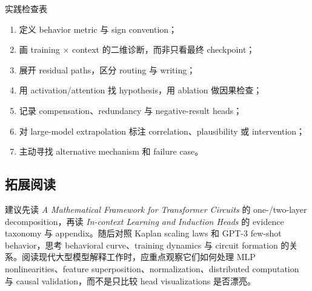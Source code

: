 \documentclass[a4paper]{article}
\begin{document}
\begin{knowledgebox}{实践检查表}
\begin{enumerate}
  \item 定义 behavior metric 与 sign convention；
  \item 画 training × context 的二维诊断，而非只看最终 checkpoint；
  \item 展开 residual paths，区分 routing 与 writing；
  \item 用 activation/attention 找 hypothesis，用 ablation 做因果检查；
  \item 记录 compensation、redundancy 与 negative-result heads；
  \item 对 large-model extrapolation 标注 correlation、plausibility 或 intervention；
  \item 主动寻找 alternative mechanism 和 failure case。
\end{enumerate}
\end{knowledgebox}

\subsection{拓展阅读}

建议先读 \emph{A Mathematical Framework for Transformer Circuits} 的 one-/two-layer decomposition，再读 \emph{In-context Learning and Induction Heads} 的 evidence taxonomy 与 appendix。随后对照 Kaplan scaling laws 和 GPT-3 few-shot behavior，思考 behavioral curve、training dynamics 与 circuit formation 的关系。阅读现代大型模型解释工作时，应重点观察它们如何处理 MLP nonlinearities、feature superposition、normalization、distributed computation 与 causal validation，而不是只比较 head visualizations 是否漂亮。

\end{document}
